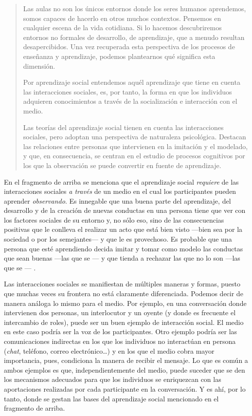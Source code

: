 \begin{quotation}
\small{Las aulas no son los únicos entornos donde los seres humanos aprendemos, somos capaces de hacerlo en otros muchos contextos. Pensemos en cualquier escena de la vida cotidiana. Si lo hacemos descubriremos entornos no formales de desarrollo, de aprendizaje, que a menudo resultan desapercibidos. Una vez recuperada esta perspectiva de los procesos de enseñanza y aprendizaje, podemos plantearnos qué significa esta dimensión. 

Por aprendizaje social entendemos aquél aprendizaje que tiene en cuenta las interacciones sociales, es, por tanto, la forma en que los individuos adquieren conocimientos a través de la socialización e interacción con el medio.

Las teorías del aprendizaje social tienen en cuenta las interacciones sociales, pero adoptan una perspectiva de naturaleza psicológica. Destacan las relaciones entre personas que intervienen en la imitación y el modelado, y que, en consecuencia, se centran en el estudio de procesos cognitivos por los que la observación se puede convertir en fuente de aprendizaje.}
\end{quotation}


En el fragmento de arriba se menciona que el aprendizaje social \textit{requiere} de las interacciones sociales \textit{a través} de un medio en el cual los participantes pueden aprender \textit{observando}. Es innegable que una buena parte del aprendizaje, del desarrollo y de la creación de nuevas conductas en una persona tiene que ver con los factores sociales de su entorno y, no sólo eso, sino de las consecuencias positivas que le conlleva el realizar un acto que está bien visto ---bien sea por la sociedad o por los semejantes--- y que le es provechoso. Es probable que una persona que esté aprendiendo decida imitar y tomar como modelo las conductas que sean buenas ---las que se --- y que tienda a rechazar las que no lo son ---las que se --- \cite{web:social-learning}.

Las interacciones sociales se manifiestan de múltiples maneras y formas, puesto que muchas veces su frontera no está claramente diferenciada. Podemos decir de manera análoga lo mismo para el medio. Por ejemplo, en una conversación donde intervienen dos personas, un interlocutor y un oyente (y donde es frecuente el intercambio de roles), puede ser un buen ejemplo de interacción social. El medio en este caso podría ser la voz de los participantes.
Otro ejemplo podría ser las comunicaciones indirectas en los que los individuos no interactúan en persona (\textit{chat}, teléfono, correo electrónico\ldots) y en los que el medio cobra mayor importancia, pues, condiciona la manera de recibir el mensaje. Lo que es común a ambos ejemplos es que, independientemente del medio, puede suceder que se den los mecanismos adecuados para que los individuos se enriquezcan con las aportaciones realizadas por cada participante en la conversación. Y es ahí, por lo tanto, donde se gestan las bases del aprendizaje social mencionado en el fragmento de arriba.

